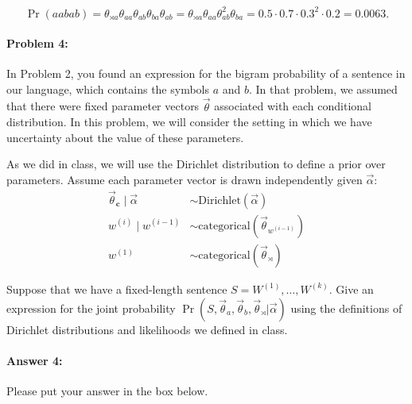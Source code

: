 \documentclass[10pt]{article}
\newenvironment{AnswerBox}{\begin{mdframed}[style=simple]}{\end{mdframed}}
\begin{document}
\begin{AnswerBox}%

    \[
    \Pr(aabab)
    = \theta_{\rtimes a}\theta_{aa}\theta_{ab}\theta_{ba}\theta_{ab}
    = \theta_{\rtimes a}\theta_{aa}\theta_{ab}^2\theta_{ba}
    = 0.5 \cdot 0.7 \cdot 0.3^2 \cdot 0.2
    = 0.0063.
    \]
    
\end{AnswerBox}%


\hrulefill %

\paragraph{Problem 4:}

In Problem 2, you found an expression for the bigram probability of a
sentence in our language, which contains the symbols $a$ and $b$. In
that problem, we assumed that there were fixed parameter vectors
$\vec{\theta}$ associated with each conditional distribution. In this
problem, we will consider the setting in which we have uncertainty
about the value of these parameters.

 As we did in class, we will use the Dirichlet distribution to 
define a prior over parameters.  Assume each parameter vector is drawn
independently given $\vec{\alpha}$:
\begin{align}
\vec{\theta}_{\mathbf{c}} \mid \vec{\alpha} 
    &\sim\mathrm{Dirichlet}(\vec{\alpha}) \\
w^{(i)} \mid  w^{(i-1)} 
    &\sim\mathrm{categorical}(\vec{\theta}_{w^{(i-1)}}) \\
w^{(1)} 
    &\sim \mathrm{categorical}(\vec{\theta}_{\rtimes})\
\end{align}

 Suppose that we have a fixed-length sentence
$S=W^{(1)},\dots,W^{(k)}$. Give an expression for the joint
probability
$\Pr(S, \vec{\theta}_{a}, \vec{\theta}_{b}, \vec{\theta}_{\rtimes} |
\vec{\alpha})$
using the definitions of Dirichlet distributions and likelihoods we
defined in class.

\paragraph{Answer 4:} Please put your answer in the box below.
\end{document}
